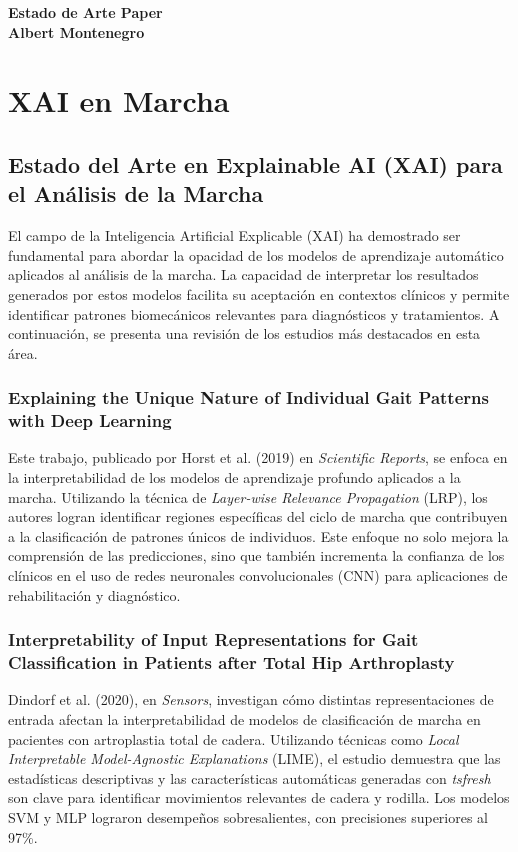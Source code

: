 \documentclass{report}
\begin{document}
\noindent\textbf{\Large Estado de Arte Paper}\\
\textbf{Albert Montenegro}\\[0.1cm]

\small 
\setcounter{tocdepth}{1}
\tableofcontents

\chapter{XAI en Marcha}

\section{Estado del Arte en Explainable AI (XAI) para el Análisis de la Marcha}

El campo de la Inteligencia Artificial Explicable (XAI) ha demostrado ser fundamental para abordar la opacidad de los modelos de aprendizaje automático aplicados al análisis de la marcha. La capacidad de interpretar los resultados generados por estos modelos facilita su aceptación en contextos clínicos y permite identificar patrones biomecánicos relevantes para diagnósticos y tratamientos. A continuación, se presenta una revisión de los estudios más destacados en esta área.

\subsection{Explaining the Unique Nature of Individual Gait Patterns with Deep Learning}
Este trabajo, publicado por Horst et al. (2019) en \textit{Scientific Reports}, se enfoca en la interpretabilidad de los modelos de aprendizaje profundo aplicados a la marcha. Utilizando la técnica de \textit{Layer-wise Relevance Propagation} (LRP), los autores logran identificar regiones específicas del ciclo de marcha que contribuyen a la clasificación de patrones únicos de individuos. Este enfoque no solo mejora la comprensión de las predicciones, sino que también incrementa la confianza de los clínicos en el uso de redes neuronales convolucionales (CNN) para aplicaciones de rehabilitación y diagnóstico.

\subsection{Interpretability of Input Representations for Gait Classification in Patients after Total Hip Arthroplasty}
Dindorf et al. (2020), en \textit{Sensors}, investigan cómo distintas representaciones de entrada afectan la interpretabilidad de modelos de clasificación de marcha en pacientes con artroplastia total de cadera. Utilizando técnicas como \textit{Local Interpretable Model-Agnostic Explanations} (LIME), el estudio demuestra que las estadísticas descriptivas y las características automáticas generadas con \textit{tsfresh} son clave para identificar movimientos relevantes de cadera y rodilla. Los modelos SVM y MLP lograron desempeños sobresalientes, con precisiones superiores al 97\%.
\end{document}
